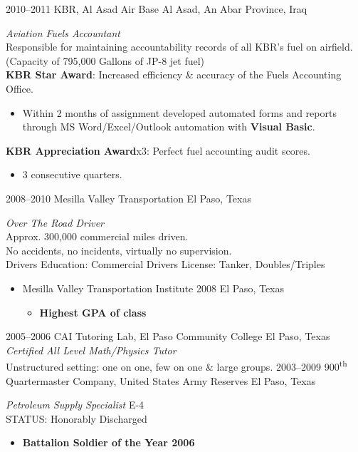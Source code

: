 \documentclass[]{friggeri-cv} %
\begin{document}
\begin{entrylist}
\entry
{2010--2011}
{KBR, Al Asad Air Base}
{Al Asad, An Abar Province, Iraq}
{\emph{Aviation Fuels Accountant} \\
Responsible for maintaining accountability records of all KBR's fuel on airfield. 
(Capacity of 795,000 Gallons of JP-8 jet fuel) \\
\textbf{KBR Star Award}: Increased efficiency \& accuracy of the Fuels Accounting Office.
\begin{itemize}
\item Within 2 months of assignment developed automated forms and reports through MS Word/Excel/Outlook automation with \textbf{Visual Basic}.
\end{itemize}
\textbf{KBR Appreciation Award}x3: Perfect fuel accounting audit scores.
\begin{itemize}
\item 3 consecutive quarters.
\end{itemize}}
\entry
{2008--2010}
{Mesilla Valley Transportation}
{El Paso, Texas}
{\emph{Over The Road Driver} \\
Approx. 300,000 commercial miles driven. \\
No accidents, no incidents, virtually no supervision. \\
Drivers Education: Commercial Drivers License: Tanker, Doubles/Triples
\begin{itemize}
\item Mesilla Valley Transportation Institute 2008 El Paso, Texas
\begin{itemize}
\item \textbf{Highest GPA of class}
\end{itemize}
\end{itemize}}
\entry
{2005--2006}
{CAI Tutoring Lab, El Paso Community College}
{El Paso, Texas}
{\emph{Certified All Level Math/Physics Tutor} \\
Unstructured setting: one on one, few on one \& large groups.}
\entry
{2003--2009}
{900\textsuperscript{th} Quartermaster Company, United States Army Reserves}
{El Paso, Texas}
{\emph{Petroleum Supply Specialist} E-4 \\ 
STATUS: Honorably Discharged
\begin{itemize}
\item \textbf{Battalion Soldier of the Year 2006}

\end{itemize}}
\end{entrylist}
\end{document}
